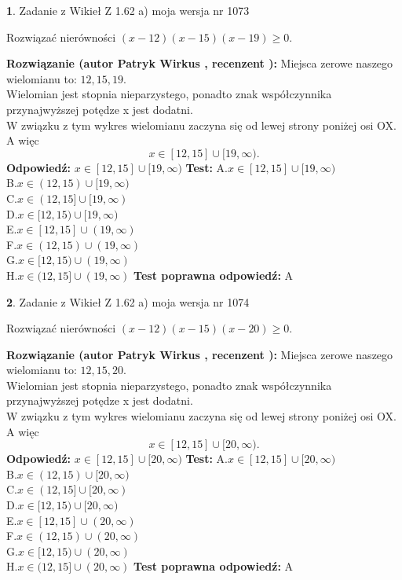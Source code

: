 \documentclass[12pt, a4paper]{article}
\theoremstyle{definition} %
\newtheorem{zad}{}
\newcommand{\zadStart}[1]{\begin{zad}#1\newline}
\newcommand{\zadStop}{\end{zad}}
\newcommand{\rozwStart}[2]{\noindent \textbf{Rozwiązanie (autor #1 , recenzent #2): }\newline}
\newcommand{\rozwStop}{\newline}
\newcommand{\odpStart}{\noindent \textbf{Odpowiedź:}\newline}
\newcommand{\odpStop}{\newline}
\newcommand{\testStart}{\noindent \textbf{Test:}\newline}
\newcommand{\testStop}{\newline}
\newcommand{\kluczStart}{\noindent \textbf{Test poprawna odpowiedź:}\newline}
\newcommand{\kluczStop}{\newline}
\begin{document}
\zadStart{Zadanie z Wikieł Z 1.62 a) moja wersja nr 1073}

Rozwiązać nierówności $(x-12)(x-15)(x-19)\ge0$.
\zadStop
\rozwStart{Patryk Wirkus}{}
Miejsca zerowe naszego wielomianu to: $12, 15, 19$.\\
Wielomian jest stopnia nieparzystego, ponadto znak współczynnika przy\linebreak najwyższej potędze x jest dodatni.\\ W związku z tym wykres wielomianu zaczyna się od lewej strony poniżej osi OX. A więc $$x \in [12,15] \cup [19,\infty).$$
\rozwStop
\odpStart
$x \in [12,15] \cup [19,\infty)$
\odpStop
\testStart
A.$x \in [12,15] \cup [19,\infty)$\\
B.$x \in (12,15) \cup [19,\infty)$\\
C.$x \in (12,15] \cup [19,\infty)$\\
D.$x \in [12,15) \cup [19,\infty)$\\
E.$x \in [12,15] \cup (19,\infty)$\\
F.$x \in (12,15) \cup (19,\infty)$\\
G.$x \in [12,15) \cup (19,\infty)$\\
H.$x \in (12,15] \cup (19,\infty)$
\testStop
\kluczStart
A
\kluczStop



\zadStart{Zadanie z Wikieł Z 1.62 a) moja wersja nr 1074}

Rozwiązać nierówności $(x-12)(x-15)(x-20)\ge0$.
\zadStop
\rozwStart{Patryk Wirkus}{}
Miejsca zerowe naszego wielomianu to: $12, 15, 20$.\\
Wielomian jest stopnia nieparzystego, ponadto znak współczynnika przy\linebreak najwyższej potędze x jest dodatni.\\ W związku z tym wykres wielomianu zaczyna się od lewej strony poniżej osi OX. A więc $$x \in [12,15] \cup [20,\infty).$$
\rozwStop
\odpStart
$x \in [12,15] \cup [20,\infty)$
\odpStop
\testStart
A.$x \in [12,15] \cup [20,\infty)$\\
B.$x \in (12,15) \cup [20,\infty)$\\
C.$x \in (12,15] \cup [20,\infty)$\\
D.$x \in [12,15) \cup [20,\infty)$\\
E.$x \in [12,15] \cup (20,\infty)$\\
F.$x \in (12,15) \cup (20,\infty)$\\
G.$x \in [12,15) \cup (20,\infty)$\\
H.$x \in (12,15] \cup (20,\infty)$
\testStop
\kluczStart
A
\kluczStop
\end{document}

